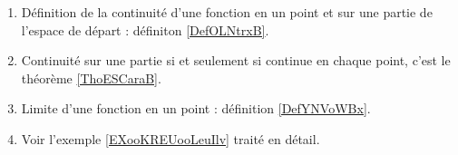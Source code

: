     \label{THEMEooGVCCooHBrNNd}

\begin{enumerate}
    \item
        Définition de la continuité d'une fonction en un point et sur une partie de l'espace de départ : définiton \ref{DefOLNtrxB}.
    \item
        Continuité sur une partie si et seulement si continue en chaque point, c'est le théorème \ref{ThoESCaraB}.
    \item
        Limite d'une fonction en un point : définition \ref{DefYNVoWBx}.
    \item
        Voir l'exemple \ref{EXooKREUooLeuIlv} traité en détail.
\end{enumerate}
